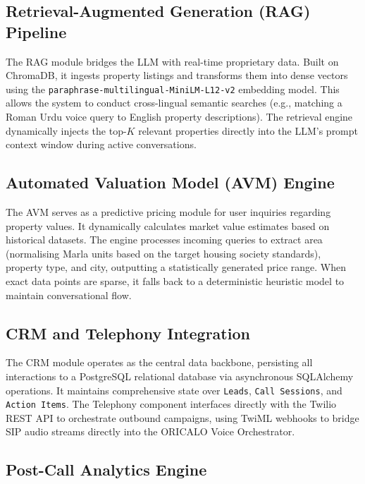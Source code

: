 \subsection{Retrieval-Augmented Generation (RAG) Pipeline}

The RAG module bridges the LLM with real-time proprietary data. Built on ChromaDB, it ingests property listings and transforms them into dense vectors using the \texttt{paraphrase-multilingual-MiniLM-L12-v2} embedding model. This allows the system to conduct cross-lingual semantic searches (e.g., matching a Roman Urdu voice query to English property descriptions). The retrieval engine dynamically injects the top-$K$ relevant properties directly into the LLM's prompt context window during active conversations.

\subsection{Automated Valuation Model (AVM) Engine}

The AVM serves as a predictive pricing module for user inquiries regarding property values. It dynamically calculates market value estimates based on historical datasets. The engine processes incoming queries to extract area (normalising Marla units based on the target housing society standards), property type, and city, outputting a statistically generated price range. When exact data points are sparse, it falls back to a deterministic heuristic model to maintain conversational flow.

\subsection{CRM and Telephony Integration}

The CRM module operates as the central data backbone, persisting all interactions to a PostgreSQL relational database via asynchronous SQLAlchemy operations. It maintains comprehensive state over \texttt{Leads}, \texttt{Call Sessions}, and \texttt{Action Items}. The Telephony component interfaces directly with the Twilio REST API to orchestrate outbound campaigns, using TwiML webhooks to bridge SIP audio streams directly into the ORICALO Voice Orchestrator.

\subsection{Post-Call Analytics Engine}


